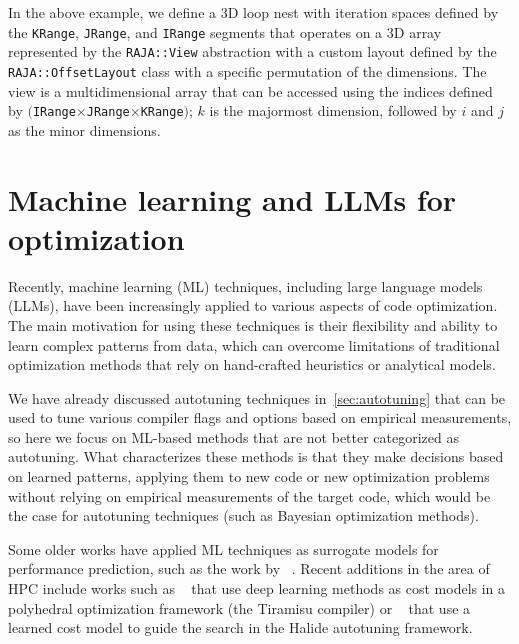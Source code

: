 In the above example, we define a 3D loop nest with iteration spaces defined by the \lstinline{KRange}, \lstinline{JRange}, and \lstinline{IRange} segments that operates on a 3D array represented by the \lstinline{RAJA::View} abstraction with a custom layout defined by the \lstinline{RAJA::OffsetLayout} class with a specific permutation of the dimensions. The view is a multidimensional array that can be accessed using the indices defined by $($\lstinline{IRange}$\times$\lstinline{JRange}$\times$\lstinline{KRange}$)$; $k$ is the majormost dimension, followed by $i$ and $j$ as the minor dimensions.


\section{Machine learning and LLMs for optimization}\label{sec:ml-and-llms-for-optimization}


Recently, machine learning (ML) techniques, including large language models (LLMs), have been increasingly applied to various aspects of code optimization. The main motivation for using these techniques is their flexibility and ability to learn complex patterns from data, which can overcome limitations of traditional optimization methods that rely on hand-crafted heuristics or analytical models.

We have already discussed autotuning techniques in~\cref{sec:autotuning} that can be used to tune various compiler flags and options based on empirical measurements, so here we focus on ML-based methods that are not better categorized as autotuning. What characterizes these methods is that they make decisions based on learned patterns, applying them to new code or new optimization problems without relying on empirical measurements of the target code, which would be the case for autotuning techniques (such as Bayesian optimization methods).

Some older works have applied ML techniques as surrogate models for performance prediction, such as the work by \citeauthor{fursin2011milepost}~\cite{fursin2011milepost}. Recent additions in the area of HPC include works such as \citeauthor{baghdadi2021deep}~\cite{baghdadi2021deep} that use deep learning methods as cost models in a polyhedral optimization framework (the Tiramisu compiler) or \citeauthor{adams2019learning}~\cite{adams2019learning} that use a learned cost model to guide the search in the Halide autotuning framework.

